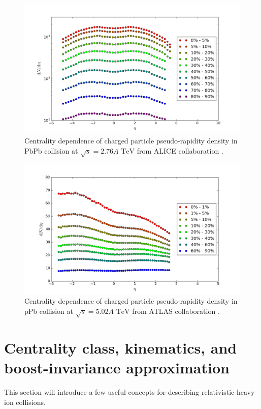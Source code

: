 \documentclass[aps,prl,twocolumn,groupedaddress]{revtex4-1}
\begin{document}
\begin{figure}
\begin{center}
\includegraphics[width=\columnwidth]{pics/dNdy-PbPb.png}
\caption{Centrality dependence of charged particle pseudo-rapidity density in PbPb collision at $\sqrt{s} = 2.76 A \textrm{ TeV}$ from ALICE collaboration \citep{ALICE:2015kda}.}
\label{AA-dNdy}
\end{center}
\end{figure}

\begin{figure}
\begin{center}
\includegraphics[width=\columnwidth]{pics/dNdy-pPb.png}
\caption{Centrality dependence of charged particle pseudo-rapidity density in pPb collision at $\sqrt{s} = 5.02 A \textrm{ TeV}$ from ATLAS collaboration \citep{Aad:2015zza}.}
\label{pA-dNdy}
\end{center}
\end{figure}

\section{Centrality class, kinematics, and boost-invariance approximation}
	This section will introduce a few useful concepts for describing relativistic heavy-ion collisions.
	
\end{document}
